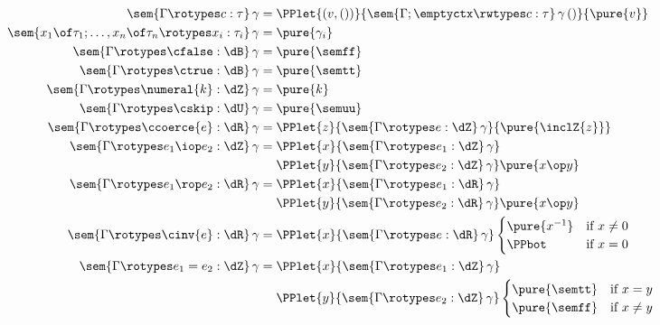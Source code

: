 \begin{figure}
  \begin{mdframed}
  \centering
  \small
\begin{align*}
  \sem{\Gamma \rotypes c : \tau} \, \gamma = {}&
     \PPlet
        {(v, ())}
        {\sem{\Gamma; \emptyctx \rwtypes c : \tau} \, \gamma \, ()}
        {\pure{v}}
  \\
  \sem{x_1 \of \tau_1; \ldots, x_n \of \tau_n \rotypes x_i : \tau_i} \, \gamma
  = {}& \pure{\gamma_i}
  \\
  \sem{\Gamma \rotypes \cfalse : \dB} \, \gamma = {}& \pure{\semff} \\
  \sem{\Gamma \rotypes \ctrue : \dB} \, \gamma = {}& \pure{\semtt} \\
  \sem{\Gamma \rotypes \numeral{k} : \dZ} \, \gamma = {}& \pure{k} \\
  \sem{\Gamma \rotypes \cskip : \dU} \, \gamma = {}& \pure{\semuu} \\
  \sem{\Gamma \rotypes \ccoerce{e} : \dR} \, \gamma = {}& \PPlet
        {z}
        {\sem{\Gamma \rotypes e : \dZ}\,\gamma}
        {\pure{\inclZ{z}}}
  \\
  \sem{\Gamma \rotypes e_1 \iop e_2 : \dZ} \, \gamma = {}&
    \PPlet
    {x}
    {\sem{\Gamma \rotypes e_1 : \dZ}\,\gamma} 
 \\
 & \PPlet
    {y}
    {\sem{\Gamma \rotypes e_2 : \dZ}\,\gamma}
    \pure{x \op y}
 \\
 \sem{\Gamma \rotypes e_1 \rop e_2 : \dR} \, \gamma = {}& 
   \PPlet
    {x}
    {\sem{\Gamma \rotypes e_1 : \dR}\,\gamma}
\\
& \PPlet
    {y}
    {\sem{\Gamma \rotypes e_2 : \dR}\,\gamma}
    \pure{x \op y}
 \\
 \sem{\Gamma \rotypes \cinv{e} : \dR} \, \gamma = {}&
 \PPlet
    {x}
    {\sem{\Gamma \rotypes e : \dR}\,\gamma}
    \begin{cases} 
    \pure{x^{-1}} & \text{if $x \neq 0$} \\
    \PPbot  & \text{if $x=0$}
    \end{cases}
 \\
  \sem{\Gamma \rotypes e_1 = e_2 : \dZ} \, \gamma = {}&
    \PPlet
    {x}
    {\sem{\Gamma \rotypes e_1 : \dZ}\,\gamma}
\\
& 
\PPlet
    {y}
    {\sem{\Gamma \rotypes e_2 : \dZ}\,\gamma}
    \begin{cases} 
    \pure{\semtt} & \text{if $x = y$} \\
    \pure{\semff} & \text{if $x \neq y$}
    \end{cases}

\end{align*}
\end{mdframed}
\end{figure}
